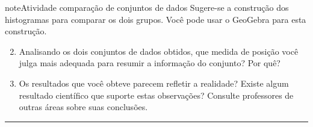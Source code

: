 \begin{sphinxadmonition}{note}{Atividade}{ comparação de conjuntos de dados}
Sugere-se a construção dos histogramas para comparar os dois grupos. Você pode usar o GeoGebra para esta construção.
\end{sphinxadmonition}
\begin{enumerate}
\setcounter{enumi}{1}
\item {} 
Analisando os dois conjuntos de dados obtidos, que medida de posição você julga mais adequada para resumir a informação do conjunto? Por quê?

\item {} 
Os resultados que você obteve parecem refletir a realidade? Existe algum resultado científico que suporte estas observações? Consulte  professores de outras áreas sobre suas conclusões.

\end{enumerate}
\label{\detokenize{PE104-5:ativ-aproxima-dpa-usando-r}}

\bigskip\hrule\bigskip

